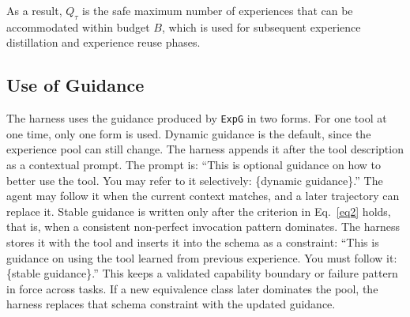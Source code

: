\documentclass[11pt]{article}
\newcommand{\ours}{\texttt{ExpG}}
\begin{document}
As a result, $Q_\tau$ is the safe maximum number of experiences that can be accommodated within budget $B$, which is used for subsequent experience distillation and experience reuse phases.

\subsection{Use of Guidance}
The harness uses the guidance produced by {\ours} in two forms. For one tool at one time, only one form is used. 
Dynamic guidance is the default, since the experience pool can still change. The harness appends it after the tool description as a contextual prompt. The prompt is: ``This is optional guidance on how to better use the tool. You may refer to it selectively: \{dynamic guidance\}.'' The agent may follow it when the current context matches, and a later trajectory can replace it.
Stable guidance is written only after the criterion in Eq.~\ref{eq2} holds, that is, when a consistent non-perfect invocation pattern dominates. The harness stores it with the tool and inserts it into the schema as a constraint: ``This is guidance on using the tool learned from previous experience. You must follow it: \{stable guidance\}.'' This keeps a validated capability boundary or failure pattern in force across tasks. If a new equivalence class later dominates the pool, the harness replaces that schema constraint with the updated guidance.

\begin{table}[t]
\centering
\caption{Ablation study of alternative variants across different phases of {\ours}. All numbers are Pass@1 on BFCL-V3 with Qwen3-8B. Each row replaces one component of the original design.}
\label{tab:variants}
\vspace{-1mm}
\end{table}
\end{document}
